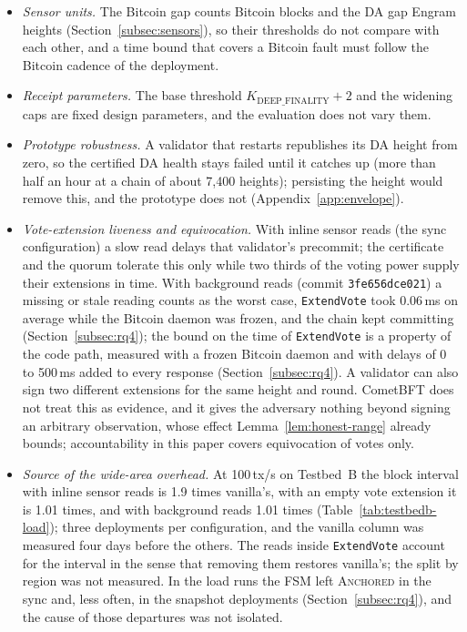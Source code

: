 \begin{itemize}
  Celestia itself, which is not deterministic: honest validators can disagree on
  the validity of a proposal, as the rounds and the longest gaps in
  Table~\ref{tab:rq2} show. All seven validators read the same Bitcoin node and the
  same Celestia chain on one host, so their readings agree far more often than
  they would across independent nodes, and we did not inject disagreement between
  them. Neither baseline can run while a layer is down, by construction, and
  neither locks withdrawals.
  \item \emph{Sensor units.} The Bitcoin gap counts Bitcoin blocks and the DA gap
  Engram heights (Section~\ref{subsec:sensors}), so their thresholds do not compare
  with each other, and a time bound that covers a Bitcoin fault must follow the Bitcoin
  cadence of the deployment.
  \item \emph{Receipt parameters.} The base threshold $K_{\text{DEEP\_FINALITY}} + 2$
  and the widening caps are fixed design parameters, and the evaluation does not
  vary them.
  \item \emph{Prototype robustness.} A validator that restarts republishes its DA
  height from zero, so the certified DA health stays failed until it catches up (more
  than half an hour at a chain of about 7{,}400 heights); persisting the height would
  remove this, and the prototype does not (Appendix~\ref{app:envelope}).
  \item \emph{Vote-extension liveness and equivocation.} With inline sensor reads (the sync configuration) a slow read delays that validator's precommit; the certificate and the quorum tolerate this only while two thirds of the voting power supply their extensions in time. With background reads (commit \texttt{3fe656dce021}) a missing or stale reading counts as the worst case, \texttt{ExtendVote} took 0.06\,ms on average while the Bitcoin daemon was frozen, and the chain kept committing (Section~\ref{subsec:rq4}); the bound on the time of \texttt{ExtendVote} is a property of the code path, measured with a frozen Bitcoin daemon and with delays of 0 to 500\,ms added to every response (Section~\ref{subsec:rq4}). A validator can also sign two different extensions for the same height and round. CometBFT does not treat this as evidence, and it gives the adversary nothing beyond signing an arbitrary observation, whose effect Lemma~\ref{lem:honest-range} already bounds; accountability in this paper covers equivocation of votes only.
  \item \emph{Source of the wide-area overhead.} At 100\,tx/s on Testbed~B the block interval with inline sensor reads is 1.9 times vanilla's, with an empty vote extension it is 1.01 times, and with background reads 1.01 times (Table~\ref{tab:testbedb-load}); three deployments per configuration, and the vanilla column was measured four days before the others. The reads inside \texttt{ExtendVote} account for the interval in the sense that removing them restores vanilla's; the split by region was not measured. In the load runs the FSM left \textsc{Anchored} in the sync and, less often, in the snapshot deployments (Section~\ref{subsec:rq4}), and the cause of those departures was not isolated.

\end{itemize}
